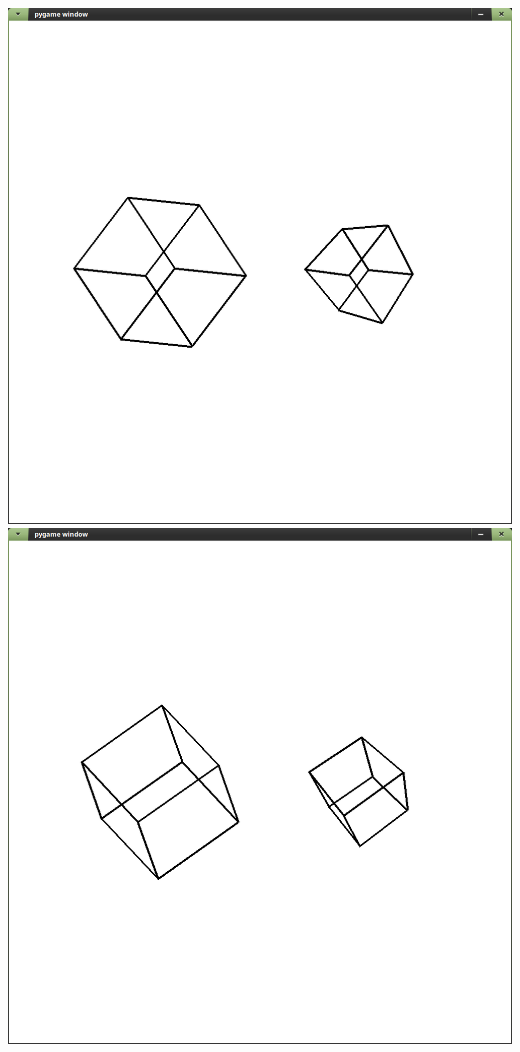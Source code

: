 \documentclass[a4paper,14pt,english,crop=false]{standalone}
\begin{document}
\includegraphics[width=\textwidth]{figures/pygame_window_067}
\includegraphics[width=\textwidth]{figures/pygame_window_068}
\end{document}
